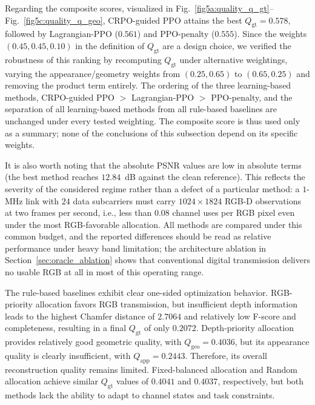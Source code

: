 \documentclass[journal]{IEEEtran}
\begin{document}
Regarding the composite scores, visualized in Fig.~\ref{fig5a:quality_q_gt}--Fig.~\ref{fig5c:quality_q_geo}, CRPO-guided PPO attains the best $Q_{\mathrm{gt}}=0.578$, followed by Lagrangian-PPO ($0.561$) and PPO-penalty ($0.555$). Since the weights $(0.45, 0.45, 0.10)$ in the definition of $Q_{\mathrm{gt}}$ are a design choice, we verified the robustness of this ranking by recomputing $Q_{\mathrm{gt}}$ under alternative weightings, varying the appearance/geometry weights from $(0.25, 0.65)$ to $(0.65, 0.25)$ and removing the product term entirely. The ordering of the three learning-based methods, CRPO-guided PPO $>$ Lagrangian-PPO $>$ PPO-penalty, and the separation of all learning-based methods from all rule-based baselines are unchanged under every tested weighting. The composite score is thus used only as a summary; none of the conclusions of this subsection depend on its specific weights.

It is also worth noting that the absolute PSNR values are low in absolute terms (the best method reaches $12.84$~dB against the clean reference). This reflects the severity of the considered regime rather than a defect of a particular method: a $1$-MHz link with $24$ data subcarriers must carry $1024\times1824$ RGB-D observations at two frames per second, i.e., less than $0.08$ channel uses per RGB pixel even under the most RGB-favorable allocation. All methods are compared under this common budget, and the reported differences should be read as relative performance under heavy band limitation; the architecture ablation in Section~\ref{sec:oracle_ablation} shows that conventional digital transmission delivers no usable RGB at all in most of this operating range.

The rule-based baselines exhibit clear one-sided optimization behavior. RGB-priority allocation favors RGB transmission, but insufficient depth information leads to the highest Chamfer distance of $2.7064$ and relatively low F-score and completeness, resulting in a final $Q_{\mathrm{gt}}$ of only $0.2072$. Depth-priority allocation provides relatively good geometric quality, with $Q_{\mathrm{geo}}=0.4036$, but its appearance quality is clearly insufficient, with $Q_{\mathrm{app}}=0.2443$. Therefore, its overall reconstruction quality remains limited. Fixed-balanced allocation and Random allocation achieve similar $Q_{\mathrm{gt}}$ values of $0.4041$ and $0.4037$, respectively, but both methods lack the ability to adapt to channel states and task constraints.
\end{document}
